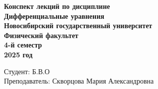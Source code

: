 \documentclass[12pt, a4paper,oneside]{book}
\begin{document}
\begin{titlepage}
    \thispagestyle{empty}  %
    \centering
    \vspace*{1cm}  %

    \textbf{\huge Конспект лекций по дисциплине}  \\[1.5cm]  %
    \textbf{\Huge Дифференциальные уравнения}  \\[2cm]   %
    \textbf{\Large Новосибирский государственный университет} \\[0.5cm]
    \textbf{\large Физический факультет} \\[0.5cm]
    \textbf{\large 4-й семестр} \\[0.5cm]
    \textbf{\large 2025 год} \\[10cm]

    \begin{flushright}
        \large Студент: Б.В.О \\[0.5cm]  %
        Преподаватель: Скворцова Мария Александровна  %
    \end{flushright}
\end{titlepage}

\tableofcontents  %

\def\mainfile{}  %

\end{document}
